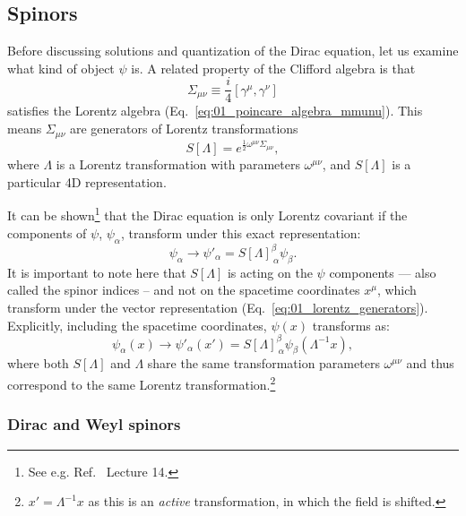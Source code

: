 \subsection{Spinors}
\label{sec:01_qft_spinors_spinors}

Before discussing solutions and quantization of the Dirac equation, let us examine what kind of object $\psi$ is.
A related property of the Clifford algebra is that
\begin{equation}
	\label{eq:01_qft_spinors_gamma_lorentz_generators}
	\Sigma_{\mu\nu} \equiv \frac{i}{4}[\gamma^\mu, \gamma^\nu]
\end{equation}
satisfies the Lorentz algebra (Eq.~\ref{eq:01_poincare_algebra_mmunu}).
This means $\Sigma_{\mu\nu}$ are generators of Lorentz transformations
\begin{equation}
	\label{eq:01_qft_spinors_spinor_lorentz_transformation}
	S[\Lambda] = e^{\frac{1}{2}\omega^{\mu\nu}\Sigma_{\mu\nu}}, 
\end{equation}
where $\Lambda$ is a Lorentz transformation with parameters $\omega^{\mu\nu}$, and $S[\Lambda]$ is a particular 4D representation.

It can be shown\footnote{See e.g. Ref.~\cite{LiuRQFT} Lecture 14.} that the Dirac equation is only Lorentz covariant if the components of $\psi$, $\psi_\alpha$, transform under this exact representation:
\begin{equation}
	\label{eq:01_qft_spinors_spinor_transformation}
	\psi_\alpha \rightarrow \psi'_\alpha = S[\Lambda]^\beta_{\ \alpha} \psi_\beta.
\end{equation}
It is important to note here that $S[\Lambda]$ is acting on the $\psi$ components --- also called the spinor indices -- and not on the spacetime coordinates $x^\mu$, which transform under the vector representation (Eq.~\ref{eq:01_lorentz_generators}).
Explicitly, including the spacetime coordinates, $\psi(x)$ transforms as:
\begin{equation}
	\label{eq:01_qft_spinors_spinor_transformation_x}
	\psi_\alpha(x) \rightarrow \psi'_\alpha(x') = S[\Lambda]^\beta_{\ \alpha} \psi_\beta(\Lambda^{-1}x),
\end{equation}
where both $S[\Lambda]$ and $\Lambda$ share the same transformation parameters $\omega^{\mu\nu}$ and thus correspond to the same Lorentz transformation.\footnote{$x' = \Lambda^{-1}x$ as this is an \textit{active} transformation, in which the field is shifted.}

\subsubsection{Dirac and Weyl spinors}

